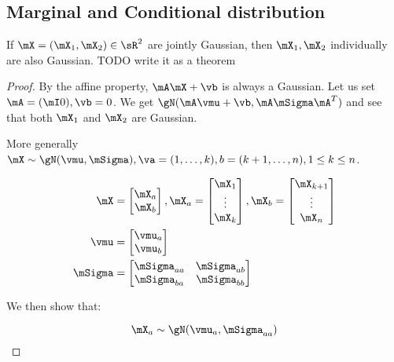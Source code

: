 \begin{tcolorbox}
    \section{Marginal and Conditional distribution}

    If $\mX = (\mX_1, \mX_2) \in \sR^2$ are jointly Gaussian, then $\mX_1,
    \mX_2$ individually are also Gaussian. {TODO write it as a theorem}

    \begin{proof}
        By the affine property, $\mA \mX + \vb$ is always a Gaussian. Let us
        set $\mA = (\mI 0), \vb = 0$. We get $\gN(\mA \vmu + \vb, \mA \mSigma
        \mA^T)$ and see that both $\mX_1$ and $\mX_2$ are Gaussian.

        More generally $\mX \sim \gN(\vmu, \mSigma), \va = (1, \dots, k), b =
        (k+1, \dots, n), 1 \leq k \leq n$.

        \begin{align}
            \mX &= \begin{bmatrix} \mX_a \\ \mX_b \end{bmatrix},
            \mX_a = \begin{bmatrix} \mX_1 \\ \vdots \\ \mX_k \end{bmatrix},
            \mX_b = \begin{bmatrix} \mX_{k+1} \\ \vdots \\ \mX_n \end{bmatrix} \\
            \vmu &= \begin{bmatrix} \vmu_a \\ \vmu_b \end{bmatrix} \\
            \mSigma &= \begin{bmatrix}
                \mSigma_{aa} & \mSigma_{ab} \\
                \mSigma_{ba} & \mSigma_{bb}
            \end{bmatrix}
        \end{align}

        We then show that:

        \begin{equation}
            \mX_a \sim \gN(\vmu_a, \mSigma_{aa})
        \end{equation}


\end{proof}
\end{tcolorbox}
